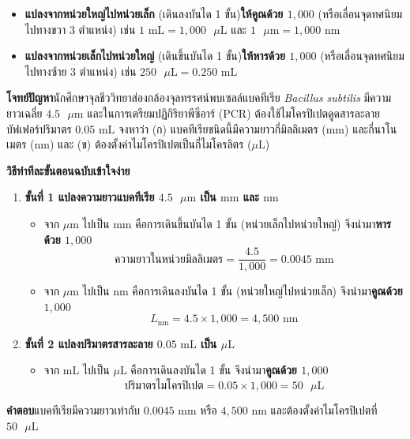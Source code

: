 \begin{conceptbox}
\begin{itemize}
    \item \textbf{แปลงจากหน่วยใหญ่ไปหน่วยเล็ก} (เดินลงบันได 1 ขั้น)\quad \textbf{ให้คูณด้วย $1{,}000$} (หรือเลื่อนจุดทศนิยมไปทางขวา 3 ตำแหน่ง) เช่น $1\text{ mL} = 1{,}000\text{ }\mu\text{L}$ และ $1\text{ }\mu\text{m} = 1{,}000\text{ nm}$
    \item \textbf{แปลงจากหน่วยเล็กไปหน่วยใหญ่} (เดินขึ้นบันได 1 ขั้น)\quad \textbf{ให้หารด้วย $1{,}000$} (หรือเลื่อนจุดทศนิยมไปทางซ้าย 3 ตำแหน่ง) เช่น $250\text{ }\mu\text{L} = 0.250\text{ mL}$
\end{itemize}
\end{conceptbox}

\begin{worked}
\textbf{โจทย์ปัญหา}\quad นักศึกษาจุลชีววิทยาส่องกล้องจุลทรรศน์พบเซลล์แบคทีเรีย \textit{Bacillus subtilis} มีความยาวเฉลี่ย $4.5\text{ }\mu\text{m}$ และในการเตรียมปฏิกิริยาพีซีอาร์ (PCR) ต้องใช้ไมโครปิเปตดูดสารละลายบัฟเฟอร์ปริมาตร $0.05\text{ mL}$ จงหาว่า (ก) แบคทีเรียชนิดนี้มีความยาวกี่มิลลิเมตร ($\text{mm}$) และกี่นาโนเมตร ($\text{nm}$) และ (ข) ต้องตั้งค่าไมโครปิเปตเป็นกี่ไมโครลิตร ($\mu\text{L}$)

\textbf{วิธีทำทีละขั้นตอนฉบับเข้าใจง่าย}
\begin{enumerate}
    \item \textbf{ขั้นที่ 1 แปลงความยาวแบคทีเรีย $4.5\text{ }\mu\text{m}$ เป็น $\text{mm}$ และ $\text{nm}$}
    \begin{itemize}
        \item จาก $\mu\text{m}$ ไปเป็น $\text{mm}$ คือการเดินขึ้นบันได 1 ขั้น (หน่วยเล็กไปหน่วยใหญ่) จึงนำมา\textbf{หารด้วย $1{,}000$}
        \[
            \text{ความยาวในหน่วยมิลลิเมตร} = \frac{4.5}{1{,}000} = 0.0045\text{ mm}
        \]
        \item จาก $\mu\text{m}$ ไปเป็น $\text{nm}$ คือการเดินลงบันได 1 ขั้น (หน่วยใหญ่ไปหน่วยเล็ก) จึงนำมา\textbf{คูณด้วย $1{,}000$}
        \[
            L_{\text{nm}} = 4.5 \times 1{,}000 = 4{,}500\text{ nm}
        \]
    \end{itemize}
    \item \textbf{ขั้นที่ 2 แปลงปริมาตรสารละลาย $0.05\text{ mL}$ เป็น $\mu\text{L}$}
    \begin{itemize}
        \item จาก $\text{mL}$ ไปเป็น $\mu\text{L}$ คือการเดินลงบันได 1 ขั้น จึงนำมา\textbf{คูณด้วย $1{,}000$}
        \[
            \text{ปริมาตรไมโครปิเปต} = 0.05 \times 1{,}000 = 50\text{ }\mu\text{L}
        \]
    \end{itemize}
\end{enumerate}
\textbf{คำตอบ}\quad แบคทีเรียมีความยาวเท่ากับ $0.0045\text{ mm}$ หรือ $4{,}500\text{ nm}$ และต้องตั้งค่าไมโครปิเปตที่ $50\text{ }\mu\text{L}$
\end{worked}

